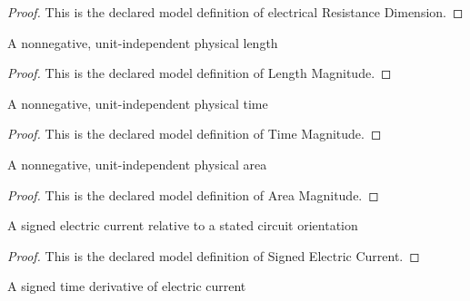 \begin{proof}
  This is the declared model definition of electrical Resistance Dimension.
\end{proof}
\begin{definition}
  \label{def:physics:phyx-mini-0930:phyxminiproblems-problemphyxmini0930-lengthmagnitude}
  A nonnegative, unit-independent physical length
\end{definition}
\begin{proof}
  This is the declared model definition of Length Magnitude.
\end{proof}
\begin{definition}
  \label{def:physics:phyx-mini-0930:phyxminiproblems-problemphyxmini0930-timemagnitude}
  A nonnegative, unit-independent physical time
\end{definition}
\begin{proof}
  This is the declared model definition of Time Magnitude.
\end{proof}
\begin{definition}
  \label{def:physics:phyx-mini-0930:phyxminiproblems-problemphyxmini0930-areamagnitude}
  A nonnegative, unit-independent physical area
\end{definition}
\begin{proof}
  This is the declared model definition of Area Magnitude.
\end{proof}
\begin{definition}
  \label{def:physics:phyx-mini-0930:phyxminiproblems-problemphyxmini0930-signedelectriccurrent}
  A signed electric current relative to a stated circuit orientation
\end{definition}
\begin{proof}
  This is the declared model definition of Signed Electric Current.
\end{proof}
\begin{definition}
  \label{def:physics:phyx-mini-0930:phyxminiproblems-problemphyxmini0930-signedelectriccurrentrate}
  A signed time derivative of electric current
\end{definition}
